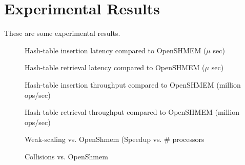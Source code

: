 \section{Experimental Results}

These are some experimental results. 

\begin{figure}[ht]
  \center
  \fbox{\rule{2.5in}{0pt}\rule[-2.5in]{0pt}{4ex}}  
  \caption{Hash-table insertion latency compared to OpenSHMEM ($\mu$ sec)}
  \label{fig:1}
\end{figure}

\begin{figure}[ht]
  \center
  \fbox{\rule{2.5in}{0pt}\rule[-2.5in]{0pt}{4ex}}  
  \caption{Hash-table retrieval latency compared to OpenSHMEM ($\mu$ sec)}
  \label{fig:2}
\end{figure}

\begin{figure}[ht]
  \center
  \fbox{\rule{2.5in}{0pt}\rule[-2.5in]{0pt}{4ex}}  
  \caption{Hash-table insertion throughput compared to OpenSHMEM
    (million ops/sec)}
  \label{fig:3}
\end{figure}


\begin{figure}[ht]
  \center
  \fbox{\rule{2.5in}{0pt}\rule[-2.5in]{0pt}{4ex}}  
  \caption{Hash-table retrieval throughput compared to OpenSHMEM
    (million ops/sec)}
  \label{fig:4}
\end{figure}

\begin{figure}[ht]
  \center
  \fbox{\rule{2.5in}{0pt}\rule[-2.5in]{0pt}{4ex}}  
  \caption{Weak-scaling vs. OpenShmem (Speedup vs. \# processors}
  \label{fig:5}
\end{figure}

\begin{figure}[ht]
  \center
  \fbox{\rule{2.5in}{0pt}\rule[-2.5in]{0pt}{4ex}}  
  \caption{Collisions vs. OpenShmem }
  \label{fig:6}
\end{figure}

